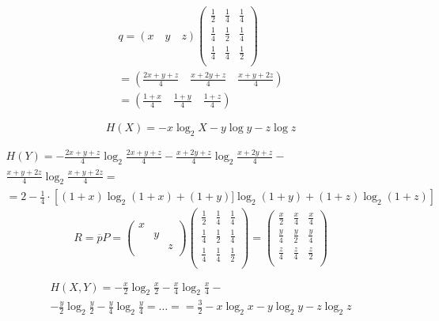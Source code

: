 \documentclass[12pt]{article}
\begin{document}
\begin{multline*}
    q=(x \quad y \quad z ) 
    \begin{pmatrix}
        \frac{1}{2} & \frac{1}{4} & \frac{1}{4} \\
        \frac{1}{4} & \frac{1}{2} & \frac{1}{4} \\
        \frac{1}{4} & \frac{1}{4} & \frac{1}{2} \\
    \end{pmatrix}  \\
    = \left( \frac{2x+y+z}{4} \quad \frac{x+2y+z}{4} \quad \frac{x + y +2z}{4}  \right) \\
    = \left( \frac{1+x}{4} \quad \frac{1+y}{4} \quad \frac{1+z}{4} \right)
\end{multline*}


$$ H(X) = -x \log_2 X - y\log y - z \log z $$ 

\begin{multline*}
H(Y) =  -\frac{2x+y+z}{4}\log_2 \frac{2x+y+z}{4} - \frac{x+2y+z}{4}\log_2 \frac{x+2y+z}{4} - \\
    \frac{x + y +2z}{4}\log_2 \frac{x + y +2z}{4} = \\
    = 2 - \frac{1}{4}\cdot\left[(1+x)\log_2(1+x) + (1+y)]\log_2(1+y)+(1+z)\log_2(1+z) \right]
\end{multline*}
$$
R =\overline{p}P=
\begin{pmatrix}
    x &    &  \\
      & y  &  \\
      &    & z \\
\end{pmatrix}
\begin{pmatrix}
    \frac{1}{2} & \frac{1}{4} & \frac{1}{4} \\
    \frac{1}{4} & \frac{1}{2} & \frac{1}{4} \\
    \frac{1}{4} & \frac{1}{4} & \frac{1}{2} \\
\end{pmatrix}
= 
\begin{pmatrix}
    \frac{x}{2} & \frac{x}{4} & \frac{x}{4} \\
    \frac{y}{4} & \frac{y}{2} & \frac{y}{4} \\
    \frac{z}{4} & \frac{z}{4} & \frac{z}{2} \\
\end{pmatrix}
$$

\begin{multline*}
H(X,Y) =  -\frac{x}{2}\log_2\frac{x}{2}-\frac{x}{4}\log_2\frac{x}{4} - \\
 -\frac{y}{2}\log_2\frac{y}{2}-\frac{y}{4}\log_2\frac{y}{4} = \dots = 
    = \frac{3}{2}-x\log_2x-y\log_2y-z\log_2z
\end{multline*}
\end{document}
